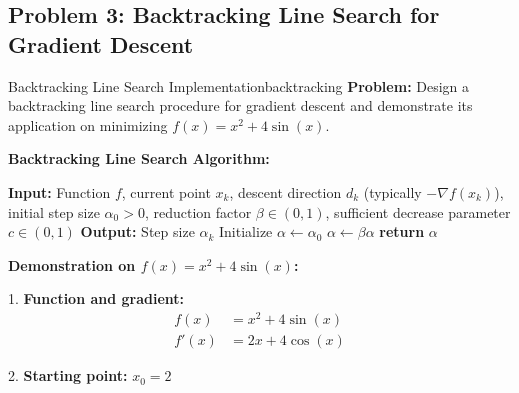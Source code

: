 \documentclass[12pt]{article}
\begin{document}
\subsection{Problem 3: Backtracking Line Search for Gradient Descent}

\begin{example}{Backtracking Line Search Implementation}{backtracking}
\textbf{Problem:} Design a backtracking line search procedure for gradient descent and demonstrate its application on minimizing $f(x) = x^2 + 4\sin(x)$.

\textbf{Backtracking Line Search Algorithm:}

\begin{algorithm}[H]
\caption{Backtracking Line Search}
\begin{algorithmic}[1]
\State \textbf{Input:} Function $f$, current point $x_k$, descent direction $d_k$ (typically $-\nabla f(x_k)$), initial step size $\alpha_0 > 0$, reduction factor $\beta \in (0,1)$, sufficient decrease parameter $c \in (0,1)$
\State \textbf{Output:} Step size $\alpha_k$
\State Initialize $\alpha \gets \alpha_0$
    \State $\alpha \gets \beta \alpha$ 
\EndWhile
\State \textbf{return} $\alpha$
\end{algorithmic}
\end{algorithm}

\textbf{Demonstration on $f(x) = x^2 + 4\sin(x)$:}

1. \textbf{Function and gradient:}
   \begin{align}
   f(x) &= x^2 + 4\sin(x) \\
   f'(x) &= 2x + 4\cos(x)
   \end{align}

2. \textbf{Starting point:} $x_0 = 2$


\end{example}
\end{document}
